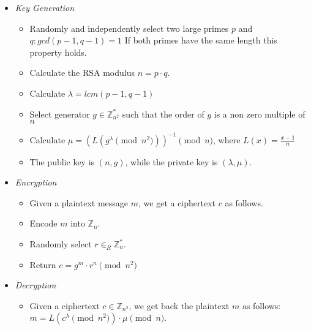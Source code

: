 \begin{itemize}
  \item \textit{Key Generation}
  \begin{itemize}
    \item Randomly and independently select two large primes $ p $ and $ q :gcd(p-1, q-1) = 1$ If both primes have the same length this property holds.
    \item Calculate the RSA modulus $n = p \cdot q$.
    \item Calculate $ \lambda = lcm(p-1, q-1)$
    \item Select generator $g \in \mathbb{Z}_{n^{2}}^{*}$ such that the order of $ g $ is a non zero multiple of $ n $
    \item Calculate $ \mu = (L(g^{\lambda} \pmod{n^{2}}))^{-1} \pmod{n}$, where $L(x) = \frac{x-1}{n}$
    \item The public key is $ (n,g) $, while the private key is $ (\lambda, \mu) $.
  \end{itemize}
  \item \textit{Encryption}
  \begin{itemize}
    \item Given a plaintext message $ m $, we get a ciphertext $c$ as follows.
    \item Encode $ m $ into $\mathbb{Z}_{n}$.
    \item Randomly select $ r \in_{R} \mathbb{Z}_{n}^{*}$.
    \item Return $c = g^{m} \cdot r^{n} \pmod{n^{2}}$
  \end{itemize}
  \item \textit{Decryption}
  \begin{itemize}
    \item Given a ciphertext $ c \in \mathbb{Z}_{n^{2}}$, we get back the plaintext $ m $ as follows: $m = L(c^{\lambda} \pmod{n^{2}}) \cdot \mu \pmod{n}$.
  \end{itemize}
\end{itemize}



